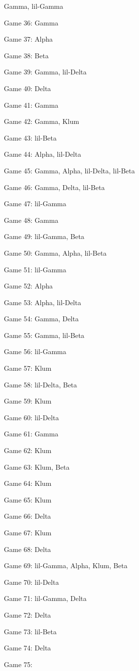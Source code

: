 \documentclass{article}
\begin{document}
\begin{multicols}{3}
\begin{compactitem}
Gamma, lil-Gamma
\item Game 36:
Gamma
\item Game 37:
Alpha
\item Game 38:
Beta
\item Game 39:
Gamma, lil-Delta
\item Game 40:
Delta
\item Game 41:
Gamma
\item Game 42:
Gamma, Klum
\item Game 43:
lil-Beta
\item Game 44:
Alpha, lil-Delta
\item Game 45:
Gamma, Alpha, lil-Delta, lil-Beta
\item Game 46:
Gamma, Delta, lil-Beta
\item Game 47:
lil-Gamma
\item Game 48:
Gamma
\item Game 49:
lil-Gamma, Beta
\item Game 50:
Gamma, Alpha, lil-Beta
\item Game 51:
lil-Gamma
\item Game 52:
Alpha
\item Game 53:
Alpha, lil-Delta
\item Game 54:
Gamma, Delta
\item Game 55:
Gamma, lil-Beta
\item Game 56:
lil-Gamma
\item Game 57:
Klum
\item Game 58:
lil-Delta, Beta
\item Game 59:
Klum
\item Game 60:
lil-Delta
\item Game 61:
Gamma
\item Game 62:
Klum
\item Game 63:
Klum, Beta
\item Game 64:
Klum
\item Game 65:
Klum
\item Game 66:
Delta
\item Game 67:
Klum
\item Game 68:
Delta
\item Game 69:
lil-Gamma, Alpha, Klum, Beta
\item Game 70:
lil-Delta
\item Game 71:
lil-Gamma, Delta
\item Game 72:
Delta
\item Game 73:
lil-Beta
\item Game 74:
Delta
\item Game 75:

\end{compactitem}
\end{multicols}
\end{document}
